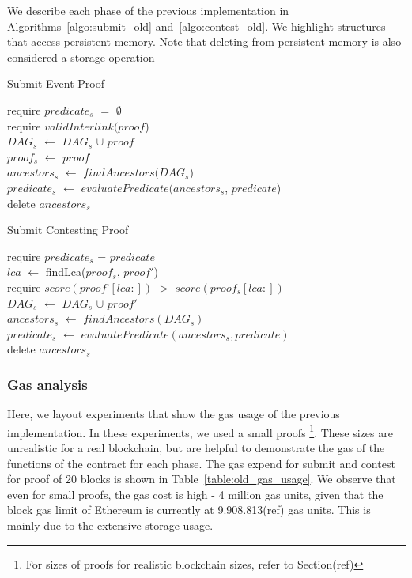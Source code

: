 We describe each phase of the previous implementation in
Algorithms~\ref{algo:submit_old} and~\ref{algo:contest_old}. We highlight
structures that access persistent memory. Note that deleting from persistent
memory is also considered a storage operation

\begin{algorithm}
    \caption{Submit Event Proof}
    \label{algo:submit_old}
    require $predicate_{s}$ $=$ $\emptyset$ \\
    require $validInterlink(proof$) \\
    $DAG_{s}$ $\leftarrow$ $DAG_{s}$ $\cup$ $proof$\\
    $proof_{s}$ $\leftarrow$ $proof$\\
    $ancestors_{s}$ $\leftarrow$ $findAncestors(DAG_{s}$)\\
    $predicate_{s}$ $\leftarrow$ $evaluatePredicate(ancestors_{s}$,
    $predicate$)\\
    delete $ancestors_{s}$\\
\end{algorithm}

\begin{algorithm}
    \caption{Submit Contesting Proof}
    \label{algo:contest_old}
    require $predicate_{s}$ = $predicate$\\
    $lca$ $\leftarrow$ findLca($proof_{s}$, $proof'$)\\
    require $score(proof’[lca:])$ $>$ $score(proof_{s}[lca:])$ \\
    $DAG_{s}$ $\leftarrow$ $DAG_{s}$ $\cup$ $proof'$\\
    $ancestors_{s}$ $\leftarrow$ $findAncestors(DAG_{s})$\\
    $predicate_{s}$ $\leftarrow$ $evaluatePredicate(ancestors_{s},
    predicate)$\\
    delete $ancestors_{s}$\\
\end{algorithm}

\subsubsection{Gas analysis}

Here, we layout experiments that show the gas usage of the previous
implementation. In these experiments, we used a small proofs \footnote{For
sizes of proofs for realistic blockchain sizes, refer to Section(ref)}. These
sizes are unrealistic for a real blockchain, but are helpful to demonstrate the
gas of the functions of the contract for each phase. The gas expend for submit
and contest for proof of 20 blocks is shown in Table~\ref{table:old_gas_usage}.
We observe that even for small proofs, the gas cost is high - 4 million gas
units, given that the block gas limit of Ethereum is currently at
9.908.813(ref) gas units. This is mainly due to the extensive storage usage.


